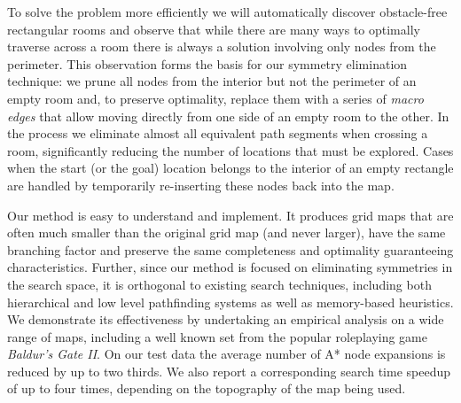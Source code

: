 To solve the problem more efficiently we will automatically discover obstacle-free rectangular rooms and 
observe that while there are many ways to optimally traverse across a room there is always a solution 
involving only nodes from the perimeter.
This observation forms the basis for our symmetry elimination technique: we prune all nodes from the interior
but not the perimeter of an empty room and, to preserve optimality,
replace them with a series of \emph{macro edges} that allow
moving directly from one side of an empty room to the other. 
In the process we eliminate almost all equivalent path segments when crossing a room,
significantly reducing the number of locations that must be explored.
Cases when the start (or the goal) location belongs to the interior of an empty rectangle are handled by
temporarily re-inserting these nodes back into the map.
\par
Our method is easy to understand and implement.
It produces grid maps that are often much smaller than the original grid map
(and never larger), have the same branching factor and preserve the same completeness and optimality 
guaranteeing characteristics.
Further, since our method is focused on eliminating symmetries in the search space, it is orthogonal to existing 
search techniques, including both hierarchical and low level pathfinding systems as well as memory-based heuristics.
We demonstrate its effectiveness by undertaking an empirical analysis on a wide range of maps, 
including a well known set from the popular roleplaying game \emph{Baldur's Gate II}. 
On our test data the average number of A* node expansions is reduced by up to two thirds.
We also report a corresponding search time speedup of up to four times, depending on the 
topography of the map being used.



